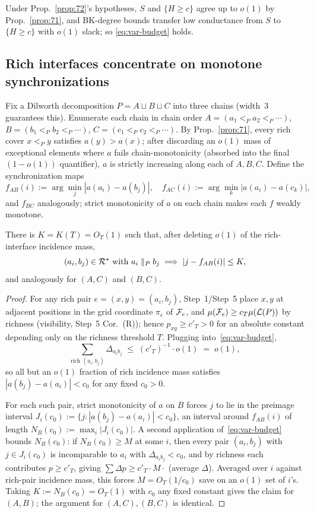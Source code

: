 Under Prop.~\ref{prop:72}'s hypotheses, $S$ and $\{H\ge c\}$ agree
up to $o(1)$ by Prop.~\ref{prop:71}, and BK-degree bounds transfer
low conductance from $S$ to $\{H\ge c\}$ with $o(1)$ slack; so
\eqref{eq:var-budget} holds.

\subsection{Rich interfaces concentrate on monotone synchronizations}

Fix a Dilworth decomposition $P=A\sqcup B\sqcup C$ into three chains
(width~$3$ guarantees this).  Enumerate each chain in chain order
$A=(a_1<_Pa_2<_P\cdots)$, $B=(b_1<_Pb_2<_P\cdots)$,
$C=(c_1<_Pc_2<_P\cdots)$.  By Prop.~\ref{prop:71}, every rich cover
$x<_Py$ satisfies $a(y)>a(x)$; after discarding an $o(1)$ mass of
exceptional elements where $a$ fails chain-monotonicity (absorbed
into the final $(1-o(1))$ quantifier), $a$ is strictly increasing
along each of $A,B,C$.  Define the synchronization maps
\[
  f_{AB}(i):=\arg\min_{j}|a(a_i)-a(b_j)|,\quad
  f_{AC}(i):=\arg\min_{k}|a(a_i)-a(c_k)|,
\]
and $f_{BC}$ analogously; strict monotonicity of $a$ on each chain
makes each $f$ weakly monotone.

\begin{lemma}\label{lem:bandwidth}
There is $K=K(T)=O_T(1)$ such that, after deleting $o(1)$ of the
rich-interface incidence mass,
\[
  (a_i,b_j)\in\mathcal{R}^\star\text{ with }a_i\parallel_P b_j
  \;\Longrightarrow\;
  |j-f_{AB}(i)|\le K,
\]
and analogously for $(A,C)$ and $(B,C)$.
\end{lemma}

\begin{proof}
For any rich pair $e=(x,y)=(a_i,b_j)$, Step~1/Step~5 place $x,y$ at
adjacent positions in the grid coordinate $\pi_e$ of
$\mathcal{F}_{e}$, and $\mu(\mathcal{F}_{e})\ge c_T\mu(\mathcal{L}(P))$ by richness
(visibility, Step~5 Cor.~(R)); hence
$p_{xy}\ge c'_T>0$ for an absolute constant depending only on
the richness threshold $T$.  Plugging into~\eqref{eq:var-budget},
\[
  \sum_{\text{rich }(a_i,b_j)}\Delta_{a_ib_j}\;\le\;(c'_T)^{-1}\cdot o(1)\;=\;o(1),
\]
so all but an $o(1)$ fraction of rich incidence mass satisfies
$|a(b_j)-a(a_i)|<c_0$ for any fixed $c_0>0$.

For each such pair, strict monotonicity of $a$ on $B$ forces $j$ to
lie in the preimage interval
$J_i(c_0):=\{j:|a(b_j)-a(a_i)|<c_0\}$, an interval around $f_{AB}(i)$
of length
$N_B(c_0):=\max_i|J_i(c_0)|$.  A second application
of~\eqref{eq:var-budget} bounds $N_B(c_0)$: if $N_B(c_0)\ge M$ at
some $i$, then every pair $(a_i,b_j)$ with $j\in J_i(c_0)$ is
incomparable to $a_i$ with $\Delta_{a_ib_j}<c_0$, and by richness each
contributes $p\ge c'_T$, giving $\sum\Delta p\ge c'_T\cdot M\cdot$
(average $\Delta$).  Averaged over $i$ against rich-pair incidence
mass, this forces $M=O_T(1/c_0)$ save on an $o(1)$ set of $i$'s.
Taking $K:=N_B(c_0)=O_T(1)$ with $c_0$ any fixed constant gives the
claim for $(A,B)$; the argument for $(A,C),(B,C)$ is identical.
\end{proof}

